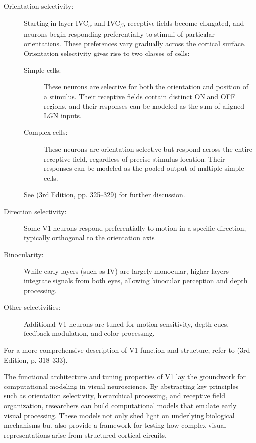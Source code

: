 \begin{description}
    \item[Orientation selectivity:] Starting in layer IVC\textsubscript{\ensuremath{\alpha}} and IVC\textsubscript{\ensuremath{\beta}}, receptive fields become elongated, and neurons begin responding preferentially to stimuli of particular orientations. These preferences vary gradually across the cortical surface. Orientation selectivity gives rise to two classes of cells:
    \begin{description}
        \item[Simple cells:] These neurons are selective for both the orientation and position of a stimulus. Their receptive fields contain distinct ON and OFF regions, and their responses can be modeled as the sum of aligned LGN inputs.
        \item[Complex cells:] These neurons are orientation selective but respond across the entire receptive field, regardless of precise stimulus location. Their responses can be modeled as the pooled output of multiple simple cells.
    \end{description}
    See \citet{bear2020neuroscience} (3rd Edition, pp. 325--329) for further discussion.

    \item[Direction selectivity:] Some V1 neurons respond preferentially to motion in a specific direction, typically orthogonal to the orientation axis.

    \item[Binocularity:] While early layers (such as IV) are largely monocular, higher layers integrate signals from both eyes, allowing binocular perception and depth processing.

    \item[Other selectivities:] Additional V1 neurons are tuned for motion sensitivity, depth cues, feedback modulation, and color processing.
\end{description}

For a more comprehensive description of V1 function and structure, refer to \citet{bear2020neuroscience} (3rd Edition, p. 318--333).

The functional architecture and tuning properties of V1 lay the groundwork for computational modeling in visual neuroscience. By abstracting key principles such as orientation selectivity, hierarchical processing, and receptive field organization, researchers can build computational models that emulate early visual processing. These models not only shed light on underlying biological mechanisms but also provide a framework for testing how complex visual representations arise from structured cortical circuits.

